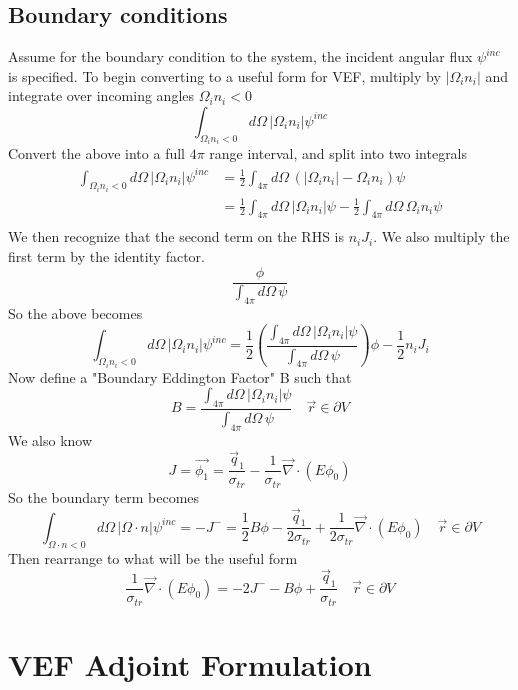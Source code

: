 \documentclass{article}
\newcommand{\vr}{\vec{r}}
\begin{document}
\subsection{Boundary conditions}
Assume for the boundary condition to the system, the incident angular flux $\psi^{inc}$ is specified. To begin converting to a useful form for VEF, multiply by $| \Omega_i n_i |$ and integrate over incoming angles $\Omega_i n_i <0$
\[
\int_{\Omega_i n_i<0} d\Omega \, \left| \Omega_i n_i \right | \psi^{inc} 
\]
Convert the above into a full $4 \pi$ range interval, and split into two integrals
\begin{align*}
\int_{\Omega_i n_i<0} d\Omega \, \left| \Omega_i n_i \right | \psi^{inc} 
&= \frac{1}{2} \int_{4 \pi} d\Omega \, \left(\left| \Omega_i n_i \right | - \Omega_i n_i  \right)\psi \\
&= \frac{1}{2} \int_{4 \pi} d\Omega \, \left| \Omega_i n_i \right | \psi - \frac{1}{2} \int_{4 \pi} d\Omega \,  \Omega_i n_i \psi \\ 
\end{align*}
We then recognize that the second term on the RHS is $n_i J_i$. We also multiply the first term by the identity factor.
\[
\frac{\phi}{\int_{4\pi} d\Omega \, \psi} 
\]
So the above becomes
\[
\int_{\Omega_i n_i<0} d\Omega \, \left| \Omega_i n_i \right | \psi^{inc} = \frac{1}{2} \left( \frac{\int_{4 \pi} d\Omega \, \left| \Omega_i n_i \right | \psi}{\int_{4\pi} d\Omega \, \psi} \right) \phi - \frac{1}{2} n_i J_i
\]
Now define a "Boundary Eddington Factor" B such that
\[
B= \frac{\int_{4 \pi} d\Omega \, \left| \Omega_i n_i \right | \psi}{\int_{4\pi} d\Omega \, \psi} \quad \vr \in \partial V
\]
We also know
\[
J = \vec{\phi_1}=\frac{\vec{q}_1}{\sigma_{tr} } - \frac{1}{\sigma_{tr} } \vec{\nabla} \cdot \left(E \phi_0 \right)  
\]
So the boundary term becomes 
\[
\int_{\Omega \cdot n<0} d\Omega \, \left| \Omega \cdot n \right | \psi^{inc} = - J^- =  \frac{1}{2} B \phi - \frac{\vec{q}_1}{2 \sigma_{tr} } + \frac{1}{2 \sigma_{tr} } \vec{\nabla} \cdot \left(E \phi_0 \right)  \quad \vr \in \partial V
\]
Then rearrange to what will be the useful form
\[
\frac{1}{\sigma_{tr} } \vec{\nabla} \cdot \left(E \phi_0 \right)  = - 2J^- - B \phi + \frac{\vec{q}_1}{ \sigma_{tr} } \quad \vr \in \partial V
\]

\section{VEF Adjoint Formulation}
\end{document}
